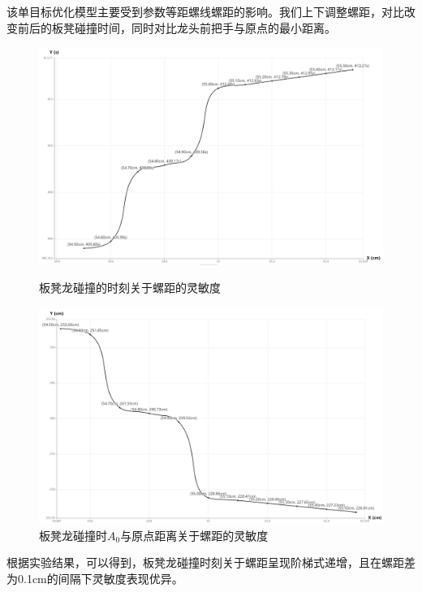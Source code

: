 \documentclass[a4paper]{article}
\begin{document}
        该单目标优化模型主要受到参数等距螺线螺距的影响。我们上下调整螺距，对比改变前后的板凳碰撞时间，同时对比龙头前把手与原点的最小距离。
\begin{figure}[h]
  \centering
  \begin{minipage}[t]{0.48\textwidth}
    \centering
    \includegraphics[width=\linewidth]{image/d_t.png}
    \caption{板凳龙碰撞的时刻关于螺距的灵敏度}
    \label{fig:left}
  \end{minipage}
  \hfill %
  \begin{minipage}[t]{0.48\textwidth}
    \centering
    \includegraphics[width=\linewidth]{image/d_p.png}
    \caption{板凳龙碰撞时$A_0$与原点距离关于螺距的灵敏度}
    \label{fig:right}
  \end{minipage}
\end{figure}


根据实验结果，可以得到，板凳龙碰撞时刻关于螺距呈现阶梯式递增，且在螺距差为0.1cm的间隔下灵敏度表现优异。
\end{document}

